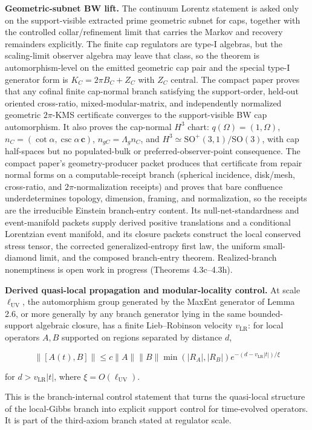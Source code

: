 \textbf{Geometric-subnet BW lift.} The continuum Lorentz statement is asked only on the support-visible extracted prime geometric subnet for caps, together with the controlled collar/refinement limit that carries the Markov and recovery remainders explicitly. The finite cap regulators are type-I algebras, but the scaling-limit observer algebra may leave that class, so the theorem is automorphism-level on the emitted geometric cap pair and the special type-I generator form is \(K_C=2\pi B_C+Z_C\) with \(Z_C\) central. The compact paper proves that any cofinal finite cap-normal branch satisfying the support-order, held-out oriented cross-ratio, mixed-modular-matrix, and independently normalized geometric \(2\pi\)-KMS certificate converges to the support-visible BW cap automorphism. It also proves the cap-normal \(H^3\) chart: \(q(\Omega)=(1,\Omega)\), \(n_C=(\cot\alpha,\csc\alpha\,\mathbf c)\), \(n_{gC}=\Lambda_gn_C\), and \(H^3\simeq\mathrm{SO}^+(3,1)/\mathrm{SO}(3)\), with cap half-spaces but no populated-bulk or preferred-observer-point consequence. The compact paper's geometry-producer packet produces that certificate from repair normal forms on a computable-receipt branch (spherical incidence, disk/mesh, cross-ratio, and \(2\pi\)-normalization receipts) and proves that bare confluence underdetermines topology, dimension, framing, and normalization, so the receipts are the irreducible Einstein branch-entry content. Its null-net-standardness and event-manifold packets supply derived positive translations and a conditional Lorentzian event manifold, and its closure packets construct the local conserved stress tensor, the corrected generalized-entropy first law, the uniform small-diamond limit, and the composed branch-entry theorem. Realized-branch nonemptiness is open work in progress (Theorems 4.3c--4.3h).

\textbf{Derived quasi-local propagation and modular-locality control.} At scale \(\ell_{\mathrm{UV}}\), the automorphism group generated by the MaxEnt generator of Lemma 2.6, or more generally by any branch generator lying in the same bounded-support algebraic closure, has a finite Lieb--Robinson velocity \(v_{\mathrm{LR}}\): for local operators \(A, B\) supported on regions separated by distance \(d\),

\[
\|[A(t), B]\| \le c \|A\| \|B\| \min(|R_A|, |R_B|) e^{-(d - v_{\mathrm{LR}}|t|)/\xi}
\]

for \(d > v_{\mathrm{LR}}|t|\), where \(\xi = O(\ell_{\mathrm{UV}})\).

This is the branch-internal control statement that turns the quasi-local structure of the
local-Gibbs branch into explicit support control for time-evolved operators. It is part of the
third-axiom branch stated at regulator scale.

